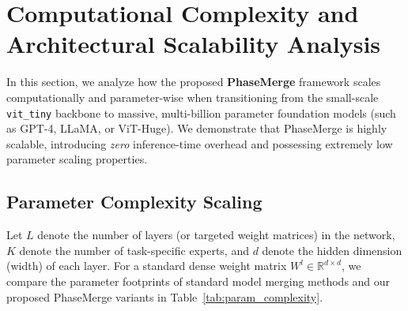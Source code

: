 \documentclass{article}
\theoremstyle{plain}
\theoremstyle{definition}
\theoremstyle{remark}
\begin{document}










\newpage
\appendix
\onecolumn

\section{Computational Complexity and Architectural Scalability Analysis}
\label{sec:app_complexity}

In this section, we analyze how the proposed \textbf{PhaseMerge} framework scales computationally and parameter-wise when transitioning from the small-scale \texttt{vit\_tiny} backbone to massive, multi-billion parameter foundation models (such as GPT-4, LLaMA, or ViT-Huge). We demonstrate that PhaseMerge is highly scalable, introducing \emph{zero} inference-time overhead and possessing extremely low parameter scaling properties.

\subsection{Parameter Complexity Scaling}
Let $L$ denote the number of layers (or targeted weight matrices) in the network, $K$ denote the number of task-specific experts, and $d$ denote the hidden dimension (width) of each layer. 
For a standard dense weight matrix $W^l \in \mathbb{R}^{d \times d}$, we compare the parameter footprints of standard model merging methods and our proposed PhaseMerge variants in Table~\ref{tab:param_complexity}.
\end{document}
